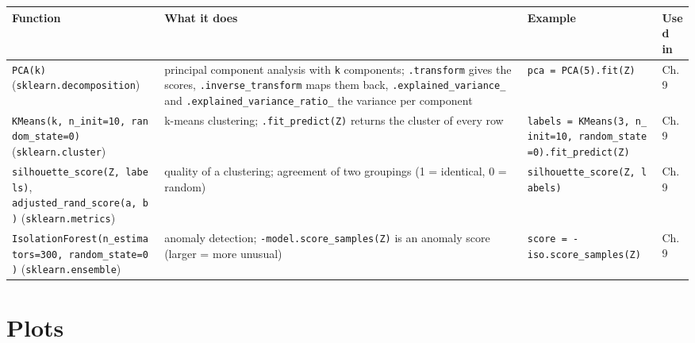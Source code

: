 \documentclass[
  letterpaper,
  DIV=11,
  numbers=noendperiod]{scrreprt}
\begin{document}
\begin{longtable}[]{@{}
  >{\raggedright\arraybackslash}p{}
  >{\raggedright\arraybackslash}p{}
  >{\raggedright\arraybackslash}p{}
  >{\raggedright\arraybackslash}p{}@{}}
\toprule\noalign{}
\begin{minipage}[b]{\linewidth}\raggedright
Function
\end{minipage} & \begin{minipage}[b]{\linewidth}\raggedright
What it does
\end{minipage} & \begin{minipage}[b]{\linewidth}\raggedright
Example
\end{minipage} & \begin{minipage}[b]{\linewidth}\raggedright
Used in
\end{minipage} \\
\midrule\noalign{}
\endhead
\bottomrule\noalign{}
\endlastfoot
\texttt{PCA(k)} (\texttt{sklearn.decomposition}) & principal component
analysis with \texttt{k} components; \texttt{.transform} gives the
scores, \texttt{.inverse\_transform} maps them back,
\texttt{.explained\_variance\_} and
\texttt{.explained\_variance\_ratio\_} the variance per component &
\texttt{pca\ =\ PCA(5).fit(Z)} & Ch. 9 \\
\texttt{KMeans(k,\ n\_init=10,\ random\_state=0)}
(\texttt{sklearn.cluster}) & k-means clustering;
\texttt{.fit\_predict(Z)} returns the cluster of every row &
\texttt{labels\ =\ KMeans(3,\ n\_init=10,\ random\_state=0).fit\_predict(Z)}
& Ch. 9 \\
\texttt{silhouette\_score(Z,\ labels)},
\texttt{adjusted\_rand\_score(a,\ b)} (\texttt{sklearn.metrics}) &
quality of a clustering; agreement of two groupings (1 = identical, 0 =
random) & \texttt{silhouette\_score(Z,\ labels)} & Ch. 9 \\
\texttt{IsolationForest(n\_estimators=300,\ random\_state=0)}
(\texttt{sklearn.ensemble}) & anomaly detection;
\texttt{-model.score\_samples(Z)} is an anomaly score (larger = more
unusual) & \texttt{score\ =\ -iso.score\_samples(Z)} & Ch. 9 \\
\end{longtable}

\section{Plots}\label{plots}
\end{document}
